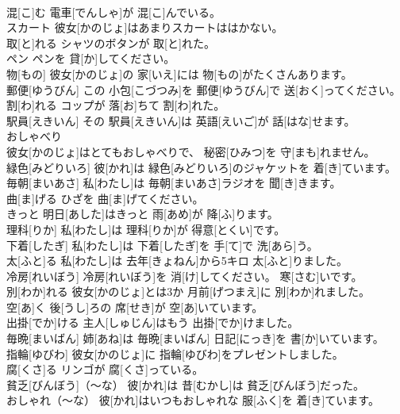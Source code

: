 \documentclass[8pt]{extreport}
\begin{document}
\begin{CJK}{UTF8}{min}
\\	混[こ]む	電車[でんしゃ]が 混[こ]んでいる。		
\\	スカート	彼女[かのじょ]はあまりスカートははかない。		
\\	取[と]れる	シャツのボタンが 取[と]れた。		
\\	ペン	ペンを 貸[か]してください。		
\\	物[もの]	彼女[かのじょ]の 家[いえ]には 物[もの]がたくさんあります。		
\\	郵便[ゆうびん]	この 小包[こづつみ]を 郵便[ゆうびん]で 送[おく]ってください。		
\\	割[わ]れる	コップが 落[お]ちて 割[わ]れた。		
\\	駅員[えきいん]	その 駅員[えきいん]は 英語[えいご]が 話[はな]せます。		
\\	おしゃべり 
\\	彼女[かのじょ]はとてもおしゃべりで、 秘密[ひみつ]を 守[まも]れません。		
\\	緑色[みどりいろ]	彼[かれ]は 緑色[みどりいろ]のジャケットを 着[き]ています。		
\\	毎朝[まいあさ]	私[わたし]は 毎朝[まいあさ]ラジオを 聞[き]きます。		
\\	曲[ま]げる	ひざを 曲[ま]げてください。		
\\	きっと	明日[あした]はきっと 雨[あめ]が 降[ふ]ります。		
\\	理科[りか]	私[わたし]は 理科[りか]が 得意[とくい]です。		
\\	下着[したぎ]	私[わたし]は 下着[したぎ]を 手[て]で 洗[あら]う。		
\\	太[ふと]る	私[わたし]は 去年[きょねん]から5キロ 太[ふと]りました。		
\\	冷房[れいぼう]	冷房[れいぼう]を 消[け]してください。 寒[さむ]いです。		
\\	別[わか]れる	彼女[かのじょ]とは3か 月前[げつまえ]に 別[わか]れました。		
\\	空[あ]く	後[うし]ろの 席[せき]が 空[あ]いています。		
\\	出掛[でか]ける	主人[しゅじん]はもう 出掛[でか]けました。		
\\	毎晩[まいばん]	姉[あね]は 毎晩[まいばん] 日記[にっき]を 書[か]いています。		
\\	指輪[ゆびわ]	彼女[かのじょ]に 指輪[ゆびわ]をプレゼントしました。		
\\	腐[くさ]る	リンゴが 腐[くさ]っている。		
\\	貧乏[びんぼう]（～な）	彼[かれ]は 昔[むかし]は 貧乏[びんぼう]だった。		
\\	おしゃれ（～な）	彼[かれ]はいつもおしゃれな 服[ふく]を 着[き]ています。		

\end{CJK}
\end{document}
